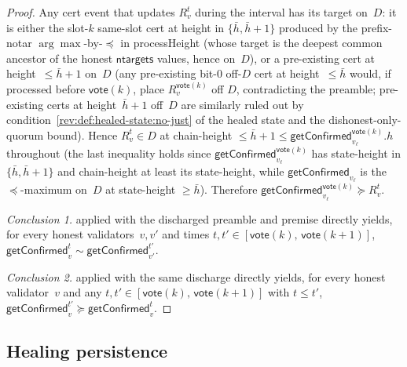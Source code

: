 \ifx\litemode\undefined\documentclass{article}\fi
\newcommand{\ntargets}{\mathsf{ntargets}}
\newcommand{\vote}{\mathsf{vote}}
\newcommand{\comm}[1]{\bar{#1}}
\newcommand{\processHeight}{\textsf{processHeight}\xspace}
\newcommand{\getConfirmed}{\textsf{getConfirmed}\xspace}
\theoremstyle{plain}
\theoremstyle{definition}
\theoremstyle{remark}
\begin{document}
\begin{proof}
Any cert event that updates $R_v^t$ during the interval has its target on~$D$: it is either the slot-$k$ same-slot cert at height in $\{\comm{h}, \comm{h}+1\}$ produced by the prefix-notar $\arg\max$-by-$\preceq$ in \processHeight{} (whose target is the deepest common ancestor of the honest $\ntargets$ values, hence on~$D$), or a pre-existing cert at height~$\leq \comm{h}+1$ on~$D$ (any pre-existing bit-$0$ off-$D$ cert at height~$\leq \comm{h}$ would, if processed before $\vote(k)$, place $R_v^{\vote(k)}$ off $D$, contradicting the preamble; pre-existing certs at height~$\comm{h}+1$ off~$D$ are similarly ruled out by condition~\ref{rev:def:healed-state:no-just} of the healed state and the dishonest-only-quorum bound). Hence $R_v^t \in D$ at chain-height $\leq \comm{h}+1 \leq \getConfirmed_{v_\ell}^{\vote(k)}.h$ throughout (the last inequality holds since $\getConfirmed_{v_\ell}^{\vote(k)}$ has state-height in $\{\comm{h}, \comm{h}+1\}$ and chain-height at least its state-height, while $\getConfirmed_{v_\ell}$ is the $\preceq$-maximum on~$D$ at state-height $\geq \comm{h}$). Therefore $\getConfirmed_{v_\ell}^{\vote(k)} \succeq R_v^t$.

\emph{Conclusion 1.}
 applied with the discharged preamble and premise directly yields, for every honest validators~$v, v'$ and times $t, t' \in [\vote(k),\, \vote(k+1)]$, $\getConfirmed_v^t \sim \getConfirmed_{v'}^{t'}$.

\emph{Conclusion 2.}
 applied with the same discharge directly yields, for every honest validator~$v$ and any $t, t' \in [\vote(k),\, \vote(k+1)]$ with $t \leq t'$, $\getConfirmed_v^{t'} \succeq \getConfirmed_v^t$.
\end{proof}

\subsection{Healing persistence}\label{rev:sec:healing-persistence}
\end{document}
